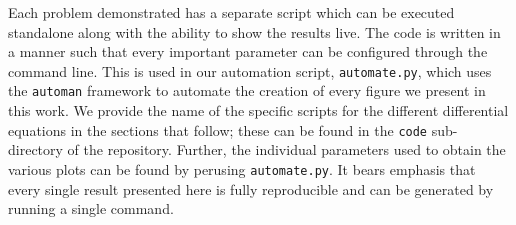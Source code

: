 \documentclass[12pt]{article}
\begin{document}
Each problem demonstrated has a separate script which can be executed standalone along with the ability to show the results live. The code is written in a manner such that every important parameter can be configured through the command line.  This is used in our automation script, \verb|automate.py|, which uses the \verb|automan| framework to automate the creation of every figure we present in this work.  We provide the name of the specific scripts for the different differential equations in the sections that follow; these can be found in the \verb|code| sub-directory of the repository. Further, the individual parameters used to obtain the various plots can be found by perusing \verb|automate.py|.  It bears emphasis that every single result presented here is fully reproducible and can be generated by running a single command.
\end{document}
